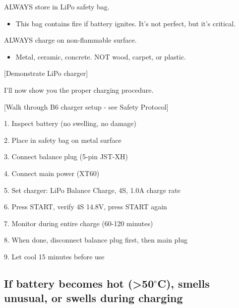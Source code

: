 \documentclass[11pt,letterpaper]{article}
\begin{document}
{ALWAYS store in LiPo safety bag.\par

\begin{itemize}
  \item This bag contains fire if battery ignites. It's not perfect, but it's critical.
\end{itemize}

ALWAYS charge on non-flammable surface.\par

\begin{itemize}
  \item Metal, ceramic, concrete. NOT wood, carpet, or plastic.
\end{itemize}

[Demonstrate LiPo charger]\par

I'll now show you the proper charging procedure.\par

[Walk through B6 charger setup - see Safety Protocol]\par

1. Inspect battery (no swelling, no damage)\par

2. Place in safety bag on metal surface\par

3. Connect balance plug (5-pin JST-XH)\par

4. Connect main power (XT60)\par

5. Set charger: LiPo Balance Charge, 4S, 1.0A charge rate\par

6. Press START, verify 4S 14.8V, press START again\par

7. Monitor during entire charge (60-120 minutes)\par

8. When done, disconnect balance plug first, then main plug\par

9. Let cool 15 minutes before use\par

\subsection{If battery becomes hot (>50$^\circ$C), smells unusual, or swells during charging}

}
\end{document}
